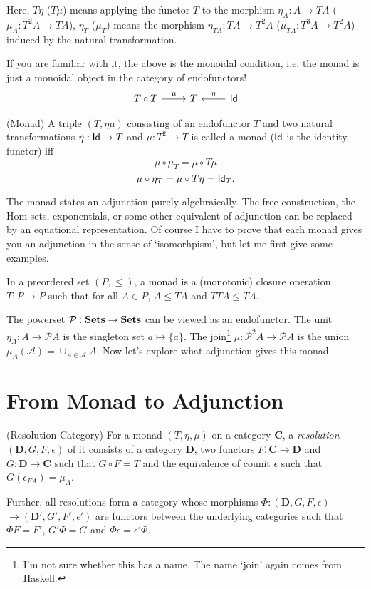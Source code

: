 Here, $T\eta$ ($T\mu$) means applying the functor $T$ to the morphism 
$\eta_A:A\to TA$ ($\mu_A: T^2A\to TA$), $\eta_T$ ($\mu_T$) means the 
morphism $\eta_{TA}:TA\to T^2A$ ($\mu_{TA}:T^3A\to T^2A$)
induced by the natural transformation. 

\null

If you are familiar with it, the above is the monoidal condition, i.e.
the monad is just a monoidal object in the category of endofunctors!
$$
\begin{tikzcd}
    T\circ T \arrow{r}{\mu} & T & \Id \arrow[swap]{l}{\eta}
\end{tikzcd}
$$

\begin{definition}
    (Monad) A triple $(T,\eta\mu)$ consisting of an endofunctor $T$
    and two natural transformations $\eta:\text{\sf Id}\to T$ and $\mu:T^2\to T$
    is called a monad ($\text{\sf Id}$ is the identity functor) iff 
    $$
        \mu\circ\mu_T=\mu\circ T\mu
    $$
    $$
        \mu\circ\eta_T=\mu\circ T\eta=\text{\sf Id}_T.
    $$
\end{definition}

The monad states an adjunction purely algebraically. The free 
construction, the Hom-sets, exponentials, or some other equivalent of 
adjunction can be replaced by an equational representation. Of course
I have to prove that each monad gives you an adjunction in the sense
of `isomorhpism', but let me first give some examples. 

\bigskip
In a preordered set $(P,\le)$, a monad is a (monotonic) closure 
operation $T:P\to P$ such that for all $A\in P$, $A\le TA$ and 
$TTA\le TA$. \bigskip

\newcommand{\powerset}{\mathcal{P}}
The powerset $\powerset: \Sets\to\Sets$ can be viewed as an endofunctor. 
The unit $\eta_A:A\to\powerset A$ is the singleton set $a\mapsto \{a\}$. 
The join\footnote{I'm not sure whether this has a name. The name `join'
again comes from Haskell.} $\mu:\powerset^2 A\to \powerset A$ is the
union $\mu_A(\mathscr{A})=\cup_{A\in\mathscr{A}}A$. Now let's explore
what adjunction gives this monad. 

\newcommand{\cat}{\mathbf}

\section{From Monad to Adjunction}
\begin{definition}(Resolution Category)
    For a monad $(T,\eta,\mu)$ on a category $\cat{C}$, a
    {\it resolution} $(\cat{D},G,F,\epsilon)$ of it consists
    of a category $\cat{D}$, two functors $F:\cat{C}\to\cat{D}$
    and $G:\cat{D}\to\cat{C}$ such that $G\circ F=T$ and the
    equivalence of counit $\epsilon$ such that $G(\epsilon_{FA})=\mu_A$.
    
    Further, all resolutions form a category whose morphisms
    $\Phi:(\cat{D},G,F,\epsilon)$ $\to(\cat{D'},G',F',\epsilon')$ are 
    functors between the underlying categories such that $\Phi F=F'$,
    $G'\Phi=G$ and $\Phi\epsilon=\epsilon'\Phi$.
\end{definition}

